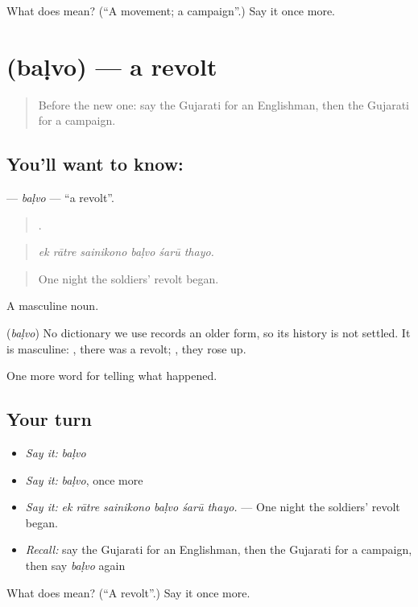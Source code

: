 \begin{tcolorbox}[breakable,colback=teal!4,colframe=teal!35!black,title={Before you move on}]
What does  mean? (\textquotedblleft{}A movement; a campaign\textquotedblright{}.) Say it once more.
\end{tcolorbox}
\section[\texorpdfstring{\gu{બળવો} (baḷvo)}{બળવો (baḷvo)}]{ (baḷvo) — a revolt}

\label{lesson:GU-C325-balvo}



\begin{quote}
Before the new one: say the Gujarati for an Englishman, then the Gujarati for a campaign.
\end{quote}

\subsection*{You'll want to know: }
\textbf{} — \emph{baḷvo} — \textquotedblleft{}a revolt\textquotedblright{}.

\begin{quote}
     .
\end{quote}

\begin{quote}
\emph{ek rātre sainikono baḷvo śarū thayo.}
\end{quote}

\begin{quote}
One night the soldiers' revolt began.
\end{quote}

A masculine noun.

\begin{cousinweb}
\textbf{} (\emph{baḷvo}) No dictionary we use records an older form, so its history is not settled. It is masculine: \textbf{ }, there was a revolt; \textbf{ }, they rose up.
\end{cousinweb}

\begin{grammarlens}[title={What you've built}]
One more word for telling what happened.
\end{grammarlens}

\subsection*{Your turn}
\begin{itemize}
\raggedright
  \item \emph{Say it:} \emph{baḷvo}
  \item \emph{Say it:} \emph{baḷvo}, once more
  \item \emph{Say it:} \emph{ek rātre sainikono baḷvo śarū thayo.} — One night the soldiers' revolt began.
  \item \emph{Recall:} say the Gujarati for an Englishman, then the Gujarati for a campaign, then say \emph{baḷvo} again
\end{itemize}

\begin{tcolorbox}[breakable,colback=teal!4,colframe=teal!35!black,title={Before you move on}]
What does  mean? (\textquotedblleft{}A revolt\textquotedblright{}.) Say it once more.
\end{tcolorbox}
